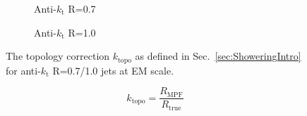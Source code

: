 \begin{figure}[!ht]
  \centering
  \begin{subfigure}{.5\textwidth}
    \centering
    \caption{Anti-$k_\mathrm{t}$ R=0.7}
  \end{subfigure}%
  \begin{subfigure}{.5\textwidth}  \centering
    \caption{Anti-$k_\mathrm{t}$ R=1.0}
  \end{subfigure}
  \caption[Topology correction using anti-$k_\mathrm{t}$ R=0.7/1.0 jets]
{\small The topology correction $k_{\mathrm {topo}}$ as defined in Sec.~\ref{sec:ShoweringIntro} for anti-$k_\mathrm{t}$ R=0.7/1.0 jets at EM scale.  }
  \label{Fig:TopoCorr_7-10}
\end{figure}

\begin{equation}
  k_{\mathrm{topo}} = \frac{R_{\mathrm{MPF}}}{R_{\mathrm{true}}}
\label{EQ:Topo6}
\end{equation}

